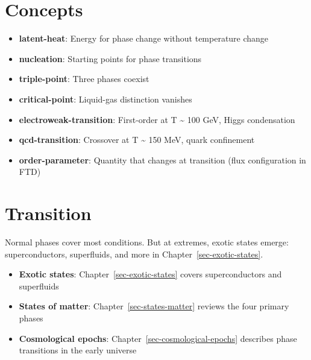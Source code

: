 \documentclass[
  11pt,
  letterpaper,
  twoside,
  openright]{book}
\providecommand{\tightlist}{%
  \setlength{\itemsep}{0pt}\setlength{\parskip}{0pt}}
\begin{document}
\section{Concepts}\label{concepts-9}

\begin{itemize}
\tightlist
\item
  \textbf{latent-heat}: Energy for phase change without temperature
  change
\item
  \textbf{nucleation}: Starting points for phase transitions
\item
  \textbf{triple-point}: Three phases coexist
\item
  \textbf{critical-point}: Liquid-gas distinction vanishes
\item
  \textbf{electroweak-transition}: First-order at T \textasciitilde{}
  100 GeV, Higgs condensation
\item
  \textbf{qcd-transition}: Crossover at T \textasciitilde{} 150 MeV,
  quark confinement
\item
  \textbf{order-parameter}: Quantity that changes at transition (flux
  configuration in FTD)
\end{itemize}

\section{Transition}\label{transition-9}

Normal phases cover most conditions. But at extremes, exotic states
emerge: superconductors, superfluids, and more in
Chapter~\ref{sec-exotic-states}.

\begin{tcolorbox}[enhanced jigsaw, leftrule=.75mm, title=\textcolor{quarto-callout-tip-color}{\faLightbulb}\hspace{0.5em}{Related Topics}, bottomrule=.15mm, opacityback=0, coltitle=black, arc=.35mm, colframe=quarto-callout-tip-color-frame, colbacktitle=quarto-callout-tip-color!10!white, colback=white, titlerule=0mm, breakable, bottomtitle=1mm, toptitle=1mm, rightrule=.15mm, toprule=.15mm, left=2mm, opacitybacktitle=0.6]

\begin{itemize}
\tightlist
\item
  \textbf{Exotic states}: Chapter~\ref{sec-exotic-states} covers
  superconductors and superfluids
\item
  \textbf{States of matter}: Chapter~\ref{sec-states-matter} reviews the
  four primary phases
\item
  \textbf{Cosmological epochs}: Chapter~\ref{sec-cosmological-epochs}
  describes phase transitions in the early universe
\end{itemize}

\end{tcolorbox}
\end{document}
